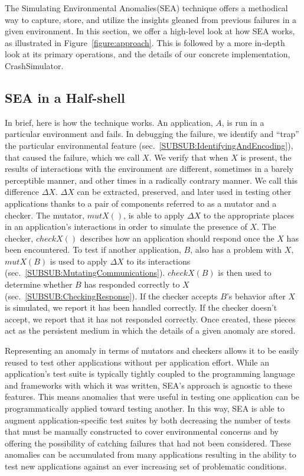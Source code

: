 The Simulating Environmental Anomalies(SEA) technique
offers a methodical way to
capture, store, and utilize the insights gleaned from
previous failures in a given environment.
In this section, we offer a high-level look at how
SEA works, as illustrated in Figure~\ref{figure:approach}.
This is followed by a more in-depth look at its primary operations,
and the details of our concrete implementation, CrashSimulator.

\subsection{SEA in a Half-shell}
\label{SEC:SEAHalfshell}
In brief,
here is how the technique works.
An application, $A$, is run
in a particular environment and fails.
In debugging the failure,
we identify and ``trap'' the particular environmental feature
(sec.~\ref{SUBSUB:IdentifyingAndEncoding}),
that caused the failure,  which we call $X$.
We verify that when $X$ is present,
the results of interactions with the
environment are different,
sometimes in a barely perceptible manner,
and other times in a radically contrary manner.
We call this difference $\Delta X$.
$\Delta X$ can be extracted, preserved,
and later used in testing other applications
thanks to a pair of components referred to as a mutator and a checker.
The mutator, $mutX()$,
is able to apply $\Delta X$
to the appropriate places in an application's interactions
in order to simulate the presence of $X$.
The checker, $checkX()$ describes how an
application should respond once the $X$ has been encountered.
To test if another application, $B$, also has a problem with $X$,
$mutX(B)$ is used to apply $\Delta X$ to its interactions
(sec.~\ref{SUBSUB:MutatingCommunications}).
$checkX(B)$ is then used to determine whether
$B$ has responded correctly to $X$(sec.~\ref{SUBSUB:CheckingResponse}).
If the checker accepts $B$'s behavior
after $X$ is simulated,
we report it has been handled correctly.
If the checker doesn't accept, we report that it has not responded correctly.
Once created,
these pieces act as the persistent medium in which the details of
a given anomaly are stored.

Representing an anomaly in terms of mutators and checkers
allows it to be easily reused to test other applications
without per application effort.
While an application's test suite is typically
tightly coupled to the programming language
and frameworks with which it was written,
SEA's approach is agnostic to these features.
This means anomalies that were useful in testing one application
can be programmatically applied toward testing another.
In this way, SEA is able to augment application-specific test suites
by both decreasing the number of tests
that must be manually constructed
to cover environmental concerns
and by offering the possibility of catching
failures that had not been considered.
These anomalies can be accumulated from many applications
resulting in the ability to test new applications
against an ever increasing
set of problematic conditions.

